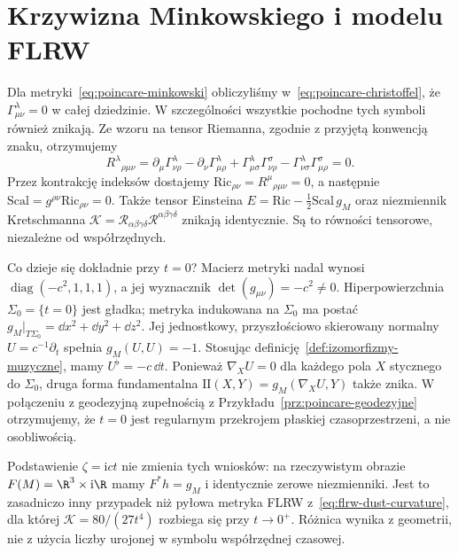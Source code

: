 \section{Krzywizna Minkowskiego i modelu FLRW}
\label{sec:krzywizna-minkowski-flrw}

\begin{przyklad}[krzywizna Poincarégo i regularność przy $t=0$]
\label{prz:poincare-krzywizna}
Dla metryki~\eqref{eq:poincare-minkowski} obliczyliśmy
w~\eqref{eq:poincare-christoffel}, że
$\Gamma^\lambda_{\mu\nu}=0$ w całej dziedzinie.
W szczególności wszystkie pochodne tych symboli
również znikają. Ze wzoru na tensor Riemanna,
zgodnie z przyjętą konwencją znaku, otrzymujemy
\begin{equation}\label{eq:poincare-riemann-zero}
 R^\lambda{}_{\rho\mu\nu}
 =\partial_\mu\Gamma^\lambda_{\nu\rho}
 -\partial_\nu\Gamma^\lambda_{\mu\rho}
 +\Gamma^\lambda_{\mu\sigma}\Gamma^\sigma_{\nu\rho}
 -\Gamma^\lambda_{\nu\sigma}\Gamma^\sigma_{\mu\rho}
 =0.
\end{equation}
Przez kontrakcję indeksów dostajemy
$\mathrm{Ric}_{\rho\nu}=R^\mu{}_{\rho\mu\nu}=0$,
a następnie $\mathrm{Scal}=g^{\rho\nu}\mathrm{Ric}_{\rho\nu}=0$.
Także tensor Einsteina
$E=\mathrm{Ric}-\frac12\mathrm{Scal}\,g_M$ oraz
niezmiennik Kretschmanna
$\mathcal K=\mathcal R_{\alpha\beta\gamma\delta}
 \mathcal R^{\alpha\beta\gamma\delta}$ znikają identycznie.
Są to równości tensorowe, niezależne od współrzędnych.

Co dzieje się dokładnie przy $t=0$?
Macierz metryki nadal wynosi
$\operatorname{diag}(-c^2,1,1,1)$, a jej wyznacznik
$\det(g_{\mu\nu})=-c^2\ne0$.
Hiperpowierzchnia $\Sigma_0=\{t=0\}$ jest gładka;
metryka indukowana na $\Sigma_0$ ma postać
$g_M|_{T\Sigma_0}=\dd x^2+\dd y^2+\dd z^2$.
Jej jednostkowy, przyszłościowo skierowany normalny
$U=c^{-1}\partial_t$ spełnia $g_M(U,U)=-1$.
Stosując definicję~\ref{def:izomorfizmy-muzyczne},
mamy $U^\flat=-c\,\dd t$.
Ponieważ $\nabla_XU=0$ dla każdego pola $X$
stycznego do $\Sigma_0$, druga forma fundamentalna
$\mathrm{II}(X,Y)=g_M(\nabla_XU,Y)$ także znika.
W połączeniu z geodezyjną zupełnością z
Przykładu~\ref{prz:poincare-geodezyjne} otrzymujemy,
że $t=0$ jest regularnym przekrojem płaskiej
czasoprzestrzeni, a nie osobliwością.

Podstawienie $\zeta=\mathrm{i}ct$ nie zmienia tych
wniosków: na rzeczywistym obrazie
$F(M)=\R^3\times\mathrm{i}\R$ mamy
$F^*h=g_M$ i identycznie zerowe niezmienniki.
Jest to zasadniczo inny przypadek niż pyłowa metryka
FLRW z~\eqref{eq:flrw-dust-curvature}, dla której
$\mathcal K=80/(27t^4)$ rozbiega się przy $t\to0^+$.
Różnica wynika z geometrii, nie z użycia liczby
urojonej w symbolu współrzędnej czasowej.
\end{przyklad}

